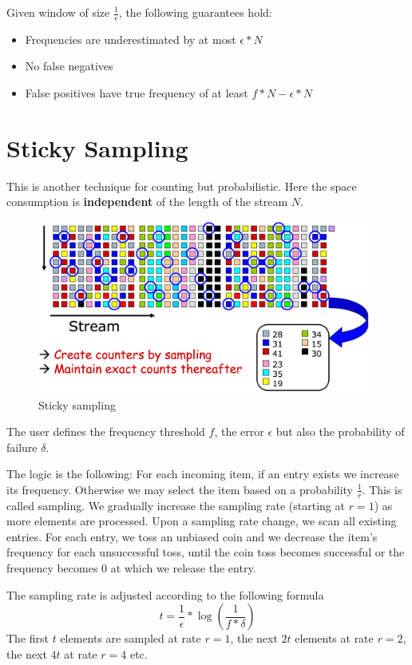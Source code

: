 \documentclass[a3paper, 12pt]{book} %
\begin{document}
Given window of size $\frac{1}{\epsilon}$, the following guarantees hold:
\begin{itemize}
	\item Frequencies are underestimated by at most $\epsilon * N$
	\item No false negatives
	\item False positives have true frequency of at least $f*N - \epsilon*N$
\end{itemize}

\section{Sticky Sampling}
This is another technique for counting but probabilistic. Here the space consumption is \textbf{independent} of the length of the stream $N$.
\begin{figure}[htpb]
	\centering
	\includegraphics[width=11cm]{figures/step1_sticky_sampling.png}
	\caption{Sticky sampling}
	\label{fig:boat1}
\end{figure}

The user defines the frequency threshold $f$, the error $\epsilon$ but also the probability of failure $\delta$.

The logic is the following: For each incoming item, if an entry exists we increase its frequency. Otherwise we may select the item based on a probability $\frac{1}{r}$. This is called sampling. We gradually increase the sampling rate (starting at $r=1$) as more elements are processed. Upon a sampling rate change, we scan all existing entries. For each entry, we toss an unbiased coin and we decrease the item's frequency for each unsuccessful toss, until the coin toss becomes successful or the frequency becomes $0$ at which we release the entry.

The sampling rate is adjusted according to the following formula
$$t = \frac{1}{\epsilon} * \log{(\frac{1}{f*\delta})}$$
The first $t$ elements are sampled at rate $r=1$, the next $2t$ elements at rate $r=2$, the next $4t$ at rate $r=4$ etc.
\end{document}
